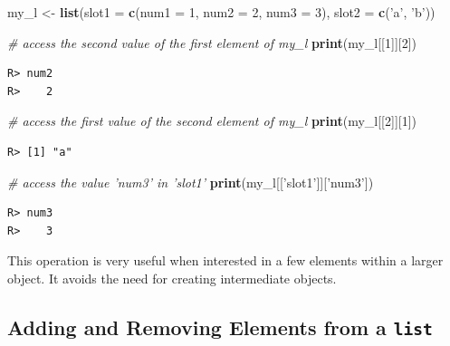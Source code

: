 \documentclass[
  12pt,
]{book}
\newenvironment{Shaded}{\begin{snugshade}}{\end{snugshade}}
\newcommand{\CommentTok}[1]{\textcolor[rgb]{0.37,0.37,0.37}{\textit{#1}}}
\newcommand{\DataTypeTok}[1]{\textcolor[rgb]{0.27,0.27,0.27}{#1}}
\newcommand{\DecValTok}[1]{\textcolor[rgb]{0.06,0.06,0.06}{#1}}
\newcommand{\KeywordTok}[1]{\textcolor[rgb]{0.27,0.27,0.27}{\textbf{#1}}}
\newcommand{\NormalTok}[1]{#1}
\newcommand{\StringTok}[1]{\textcolor[rgb]{0.5,0.5,0.5}{#1}}
\begin{document}
\begin{Shaded}
\begin{Highlighting}[]
\NormalTok{my_l <-}\StringTok{ }\KeywordTok{list}\NormalTok{(}\DataTypeTok{slot1 =} \KeywordTok{c}\NormalTok{(}\DataTypeTok{num1 =} \DecValTok{1}\NormalTok{, }
                       \DataTypeTok{num2 =} \DecValTok{2}\NormalTok{, }
                       \DataTypeTok{num3 =} \DecValTok{3}\NormalTok{), }
             \DataTypeTok{slot2 =} \KeywordTok{c}\NormalTok{(}\StringTok{'a'}\NormalTok{, }\StringTok{'b'}\NormalTok{))}

\CommentTok{# access the second value of the first element of my_l}
\KeywordTok{print}\NormalTok{(my_l[[}\DecValTok{1}\NormalTok{]][}\DecValTok{2}\NormalTok{])}
\end{Highlighting}
\end{Shaded}

\begin{verbatim}
R> num2 
R>    2
\end{verbatim}

\begin{Shaded}
\begin{Highlighting}[]
\CommentTok{# access the first value of the second element of my_l}
\KeywordTok{print}\NormalTok{(my_l[[}\DecValTok{2}\NormalTok{]][}\DecValTok{1}\NormalTok{])}
\end{Highlighting}
\end{Shaded}

\begin{verbatim}
R> [1] "a"
\end{verbatim}

\begin{Shaded}
\begin{Highlighting}[]
\CommentTok{# access the value 'num3' in 'slot1'}
\KeywordTok{print}\NormalTok{(my_l[[}\StringTok{'slot1'}\NormalTok{]][}\StringTok{'num3'}\NormalTok{])}
\end{Highlighting}
\end{Shaded}

\begin{verbatim}
R> num3 
R>    3
\end{verbatim}

This operation is very useful when interested in a few elements within a larger object. It avoids the need for creating intermediate objects.

\hypertarget{adding-and-removing-elements-from-a-list}{%
\subsection{\texorpdfstring{Adding and Removing Elements from a \texttt{list}}{Adding and Removing Elements from a list}}\label{adding-and-removing-elements-from-a-list}}
\end{document}
